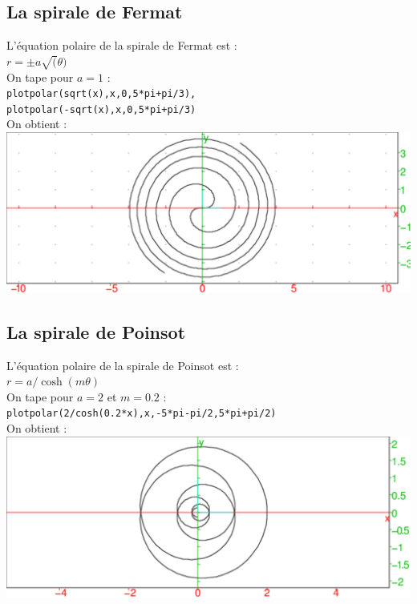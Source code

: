 \documentclass[a4paper,11pt]{book}
\begin{document}
\subsection{La spirale de Fermat}
L'\'equation polaire de la spirale de Fermat  est :\\
$r=\pm a\sqrt(\theta)$\\
On tape pour $a=1$  :\\
{\tt plotpolar(sqrt(x),x,0,5*pi+pi/3),}\\
{\tt plotpolar(-sqrt(x),x,0,5*pi+pi/3)}\\
On obtient :\\
\includegraphics[width=\textwidth]{spiral4}

\subsection{La spirale de Poinsot}
L'\'equation polaire de la spirale de Poinsot  est :\\
$r=a/\cosh(m\theta)$\\
On tape pour $a=2$ et $m=0.2$ :\\
{\tt plotpolar(2/cosh(0.2*x),x,-5*pi-pi/2,5*pi+pi/2)}\\
On obtient :\\
\includegraphics[width=\textwidth]{spiral5}
\end{document}
